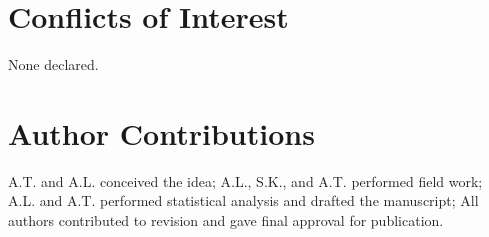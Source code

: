 \documentclass[11pt, class=article, crop=false]{standalone}
\begin{document}
\section*{Conflicts of Interest}

None declared.

\section*{Author Contributions}

A.T. and A.L. conceived the idea; A.L., S.K., and A.T. performed  field work; A.L. and A.T. performed statistical analysis and drafted the manuscript; All authors contributed to revision and gave final approval for  publication.


\end{document}
